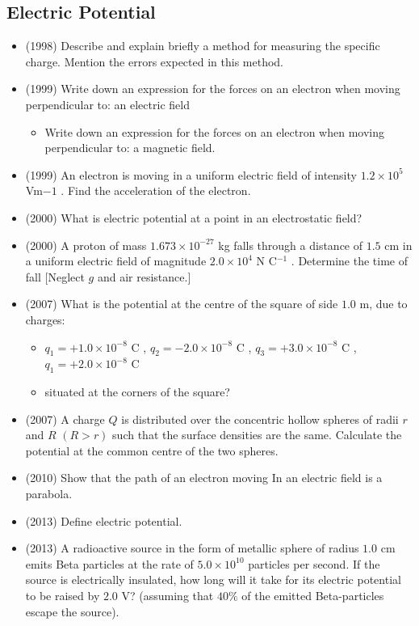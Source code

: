 \documentclass{article}
\begin{document}
\subsection{Electric Potential}
\begin{itemize}
\item (1998)  Describe and explain briefly a method for measuring the specific charge. Mention the errors expected in this method.
\item (1999)  Write down an expression for the forces on an electron when moving perpendicular to: an electric field\begin{itemize}
\item Write down an expression for the forces on an electron when moving perpendicular to: a magnetic field.
\end{itemize}
\item (1999)  An electron is moving in a uniform electric field of intensity $ 1.2 \times 10^5$ Vm​ $ -1$ .  Find the acceleration of the electron.
\item (2000)  What is electric potential at a point in an electrostatic field? 
\item (2000)  A proton of mass $ 1.673 \times 10^{-27}$ kg falls through a distance of $ 1.5$ cm in a uniform electric field of magnitude $ 2.0 \times 10^{4}$ N C$ ^{-1}$ . Determine the time of fall [Neglect $ g$ and air resistance.]
\item (2007)  What is the potential at the centre of the square of side $ 1.0$ m, due to charges:\begin{itemize}
\item $ q_{1}=+1.0\times10^{-8}$ C , $ q_{2}=-2.0\times10^{-8}$ C , $ q_{3}=+3.0\times10^{-8}$ C , $ q_{1}= +2.0\times10^{-8}$ C
\item situated at the corners of the square?
\end{itemize}
\item (2007)  A charge $ Q$ is distributed over the concentric hollow spheres of radii $ r$ and $ R$ $ (R>r)$ such that the surface densities are the same.  Calculate the potential at the common centre of the two spheres.
\item (2010)  Show that the path of an electron moving In an electric field is a parabola.
\item (2013)  Define electric potential.
\item (2013)  A radioactive source in the form of metallic sphere of radius $ 1.0$ cm emits Beta particles at the rate of $ 5.0 \times 10^{10}$ particles per second.  If the source is electrically insulated, how long will it take for its electric potential to be raised by $ 2.0$ V? (assuming that $ 40\%$ of the emitted Beta-particles escape the source).

\end{itemize}
\end{document}
